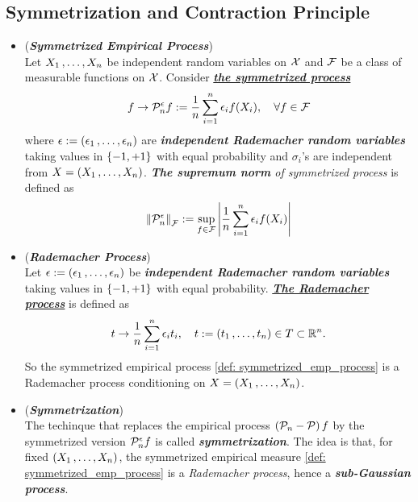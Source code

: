 \documentclass[11pt]{article}
\begin{document}
\subsection{Symmetrization and Contraction Principle}
\begin{itemize}
\item \begin{definition}(\emph{\textbf{Symmetrized Empirical Process}})\\
Let $X_1 \,{,}\ldots{,}\, X_n$ be independent random variables on ${\mathcal X}$ and ${\mathcal F}$ be a class of measurable functions on ${\mathcal X}$. Consider \underline{\emph{\textbf{the symmetrized process}}}
\begin{align}
f \to {\mathcal P}_n^{\epsilon}f := \frac{1}{n}\sum_{i=1}^{n}\epsilon_i f(X_i),  \quad  \forall f \in {\mathcal F}\label{def: symmetrized_emp_process}
\end{align} where $\epsilon := (\epsilon_1 \,{,}\ldots{,}\, \epsilon_n)$ are  \textbf{\emph{independent Rademacher random variables}} taking values in $\left\{-1, +1\right\}$ with equal probability and $\sigma_i$'s are independent from $X  = (X_1 \,{,}\ldots{,}\, X_n)$. \emph{\textbf{The supremum norm} of symmetrized process} is defined as
\begin{align*}
\left\|{\mathcal P}_n^{\epsilon}\right\|_{{\mathcal F}} := \sup_{f \in {\mathcal F}}\left\lvert \frac{1}{n}\sum_{i=1}^{n}\epsilon_i f(X_i) \right\rvert
\end{align*}
\end{definition}

\item \begin{definition}(\emph{\textbf{Rademacher Process}})\\
Let $\epsilon := (\epsilon_1 \,{,}\ldots{,}\, \epsilon_n)$ be  \textbf{\emph{independent Rademacher random variables}} taking values in $\left\{-1, +1\right\}$ with equal probability. \underline{\emph{\textbf{The Rademacher process}}} is defined as 
\begin{align}
t \to \frac{1}{n}\sum_{i=1}^{n}\epsilon_i  t_i, \quad t := (t_1 \,{,}\ldots{,}\, t_n) \in T \subset {\mathbb R}^n. \label{def: Rademacher_emp_process}
\end{align} So the symmetrized empirical process \eqref{def: symmetrized_emp_process} is a Rademacher process conditioning on $X = (X_1 \,{,}\ldots{,}\, X_n)$.
\end{definition}

\item \begin{remark}(\textbf{\emph{Symmetrization}}) \\
The techinque that replaces the empirical process $\left({\mathcal P}_n - {\mathcal P}\right)f$ by the symmetrized version ${\mathcal P}_n^{\epsilon}f $  is called \emph{\textbf{symmetrization}}. The idea is that, for fixed $(X_1 \,{,}\ldots{,}\, X_n)$, the symmetrized empirical measure \eqref{def: symmetrized_emp_process} is a \emph{Rademacher process}, hence a \emph{\textbf{sub-Gaussian process}}.
\end{remark}


\end{itemize}
\end{document}
